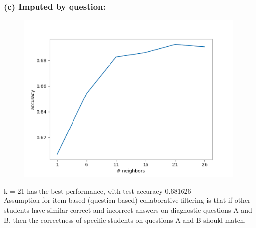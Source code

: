 \documentclass{article}
\begin{document}
\subsubsection*{(c) Imputed by question:}
\begin{figure}[htbp]
	\centering
	\includegraphics[scale=0.5]{knn_impute_by_question.png}
\end{figure}
k = 21 has the best performance, with test accuracy 0.681626\\
Assumption for item-based (question-based) collaborative filtering is that if other students have similar correct and incorrect answers on diagnostic questions A and B, then the correctness of specific 
students on questions A and B should match.
\end{document}
